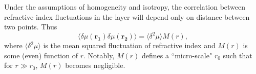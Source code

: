 Under the assumptions of homogeneity and isotropy, the correlation between refractive index fluctuations in the layer will depend only on distance between two points. Thus
\begin{equation}
\label{eq:scattering_correlation}
\langle \delta \mu(\mathbf{r_1}) \delta \mu(\mathbf{r_2}) \rangle = \langle \delta^2 \mu \rangle M(r),
\end{equation}
where $\langle \delta^2 \mu \rangle$ is the mean squared fluctuation of refractive index and $M(r)$ is some (even) function of $r$. 
Notably, $M(r)$ defines a ``micro-scale" $r_0$ such that for $r \gg r_0$, $M(r)$ becomes negligible.	
 
